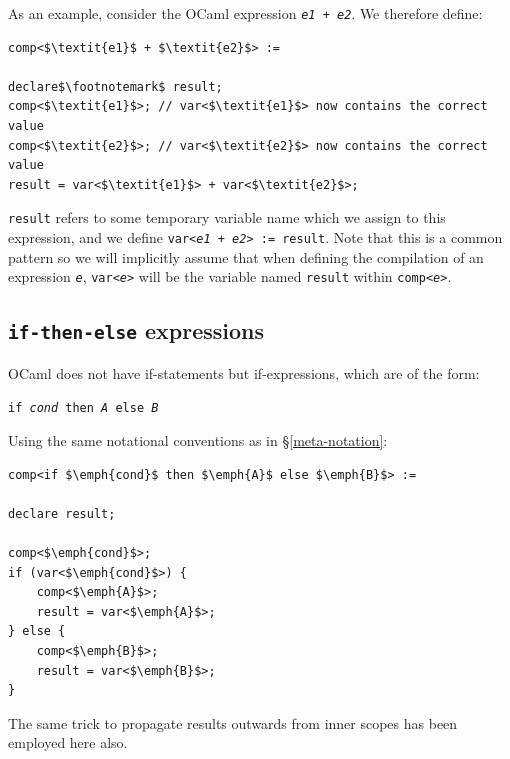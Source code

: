 \documentclass[12pt,a4paper,twoside,openright]{report}
\begin{document}
As an example, consider the OCaml expression \texttt{\textit{e1} + \textit{e2}}.
We therefore define:

\begin{lstlisting}
comp<$\textit{e1}$ + $\textit{e2}$> :=

declare$\footnotemark$ result;
comp<$\textit{e1}$>; // var<$\textit{e1}$> now contains the correct value
comp<$\textit{e2}$>; // var<$\textit{e2}$> now contains the correct value
result = var<$\textit{e1}$> + var<$\textit{e2}$>;
\end{lstlisting}

\texttt{result} refers to some temporary variable name which we assign to this
expression, and we define \texttt{var<\textit{e1} + \textit{e2}> := result}.
Note that this is a common pattern so we will implicitly assume that when
defining the compilation of an expression \texttt{\textit{e}},
\texttt{var<\textit{e}>} will be the variable named \texttt{result} within
\texttt{comp<\textit{e}>}.

\subsection{\texttt{if-then-else} expressions}

OCaml does not have if-statements but if-expressions, which are of the form:

\begin{center}
    \texttt{if \emph{cond} then \emph{A} else \emph{B}}
\end{center}

Using the same notational conventions as in \S\ref{meta-notation}:

\begin{lstlisting}
comp<if $\emph{cond}$ then $\emph{A}$ else $\emph{B}$> :=

declare result;

comp<$\emph{cond}$>;
if (var<$\emph{cond}$>) {
    comp<$\emph{A}$>;
    result = var<$\emph{A}$>;
} else {
    comp<$\emph{B}$>;
    result = var<$\emph{B}$>;
}
\end{lstlisting}

The same trick to propagate results outwards from inner scopes has been 
employed here also.
\end{document}
